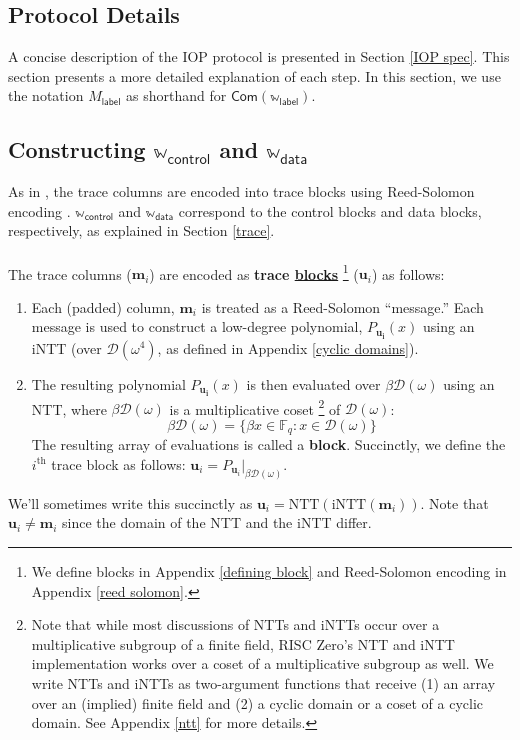 \documentclass[10pt,letterpaper,titlepage]{article}
\newcommand{\GF}[1]{\mathbb{F}_{#1}}
\newcommand{\w}[0]{\omega}
\newcommand{\D}[0]{\mathcal{D}}
\theoremstyle{definition}
\begin{document}
\begin{appendices}
\section{Protocol Details}
A concise description of the IOP protocol is presented in Section \ref{IOP spec}.
This section presents a more detailed explanation of each step.
In this section, we use the notation $M_\mathsf{label}$ as shorthand for $\mathsf{Com}(\mathbb{w}_\mathsf{label})$.
\subsection{Constructing $\mathbb{w}_\mathsf{control}$ and $\mathbb{w}_\mathsf{data}$}
\label{committing trace}
As in \cite{stark}, the trace columns are encoded into trace blocks using Reed-Solomon encoding \cite{reed-solomon}.
$\mathbb{w}_\mathsf{control}$ and $\mathbb{w}_\mathsf{data}$ correspond to the control blocks and data blocks, respectively, as explained in Section \ref{trace}.\\
\\
The trace columns ($\mathbf{m}_i$) are encoded as \textbf{trace \hyperref[blocks]{blocks}}%
\footnote{We define blocks in Appendix \ref{defining block} and Reed-Solomon encoding in Appendix \ref{reed solomon}.} ($\mathbf{u}_i$) as follows:
\begin{enumerate}
\item Each (padded) column, $\mathbf{m}_i$ is treated as a Reed-Solomon\cite{reed-solomon} ``message.''
Each message is used to construct a low-degree polynomial, $P_{\mathbf{u_i}}(x)$ using an iNTT (over $\D(\w^4)$, as defined in Appendix \ref{cyclic domains}).
\item The resulting polynomial $P_{\mathbf{u_i}}(x)$ is then evaluated over $\beta\D(\w)$ using an NTT, where $\beta\D(\w)$ is a multiplicative coset%
\footnote{Note that while most discussions of NTTs and iNTTs occur over a multiplicative subgroup of a finite field, RISC Zero's NTT and iNTT implementation works over a coset of a multiplicative subgroup as well.
We write NTTs and iNTTs as two-argument functions that receive (1) an array over an (implied) finite field and (2) a cyclic domain or a coset of a cyclic domain.
See Appendix \ref{ntt} for more details.} of $\D(\w)$:
\begin{equation*}
\beta\D(\w) = \{\beta x\in\GF{q} : x \in \D(\w)\}
\end{equation*}
The resulting array of evaluations is called a \textbf{block}. Succinctly, we define the $i^\text{th}$ trace block as follows: $\mathbf{u}_i = P_{\mathbf{u}_i}\big|_{\beta\D(\w)}$.
\end{enumerate}
We'll sometimes write this succinctly as $\mathbf{u}_i = \text{NTT}(\text{iNTT}(\mathbf{m}_i))$.
Note that $\mathbf{u}_i \neq \mathbf{m}_i$ since the domain of the NTT and the iNTT differ.

\end{appendices}
\end{document}
